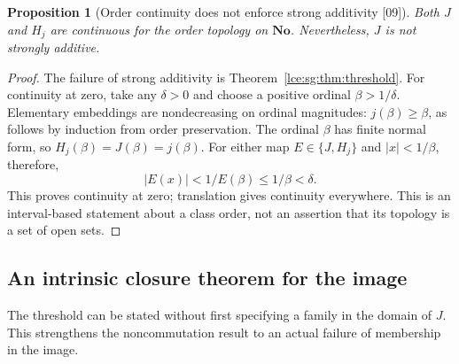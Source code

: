 \documentclass[11pt,letterpaper]{article}
\numberwithin{equation}{section}
\newtheorem{proposition}[theorem]{Proposition}
\theoremstyle{definition}
\theoremstyle{remark}
\newcommand{\No}{\mathbf{No}}
\newcommand{\abs}[1]{\lvert#1\rvert}
\newcommand{\thref}[1]{Theorem~\ref{#1}}
\newcommand{\src}[1]{\textup{\textsf{\small[#1]}}}%
\begin{document}
\begin{proposition}[Order continuity does not enforce strong additivity \src{09}]
\label{lce:sg:prop:continuity}
Both $J$ and $H_j$ are continuous for the order topology on $\No$.
Nevertheless, $J$ is not strongly additive.
\end{proposition}
\begin{proof}
The failure of strong additivity is \thref{lce:sg:thm:threshold}. For
continuity at zero, take any $\delta>0$ and choose a positive ordinal
$\beta>1/\delta$. Elementary embeddings are nondecreasing on ordinal
magnitudes: $j(\beta)\ge\beta$, as follows by induction from order
preservation. The ordinal $\beta$ has finite normal form, so
$H_j(\beta)=J(\beta)=j(\beta)$. For either map $E\in\{J,H_j\}$ and
$\abs x<1/\beta$, therefore,
\[
 \abs{E(x)}<1/E(\beta)\le1/\beta<\delta.
\]
This proves continuity at zero; translation gives continuity everywhere.
This is an interval-based statement about a class order, not an assertion
that its topology is a set of open sets.
\end{proof}

\subsection{An intrinsic closure theorem for the image}
The threshold can be stated without first specifying a family in the
domain of $J$. This strengthens the noncommutation result to an actual
failure of membership in the image.
\end{document}
